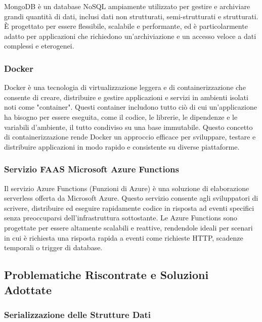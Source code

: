\documentclass{scrartcl}
\begin{document}
MongoDB è un database NoSQL ampiamente utilizzato per gestire e archiviare grandi quantità di dati, inclusi dati non strutturati, semi-strutturati e strutturati. È progettato per essere flessibile, scalabile e performante, ed è particolarmente adatto per applicazioni che richiedono un'archiviazione e un accesso veloce a dati complessi e eterogenei.

\subsubsection{Docker}

Docker è una tecnologia di virtualizzazione leggera e di containerizzazione che consente di creare, distribuire e gestire applicazioni e servizi in ambienti isolati noti come "container". Questi container includono tutto ciò di cui un'applicazione ha bisogno per essere eseguita, come il codice, le librerie, le dipendenze e le variabili d'ambiente, il tutto condiviso su una base immutabile. Questo concetto di containerizzazione rende Docker un approccio efficace per sviluppare, testare e distribuire applicazioni in modo rapido e consistente su diverse piattaforme.

\subsubsection{Servizio FAAS Microsoft Azure Functions}

Il servizio Azure Functions\cite{azurefunctions} (Funzioni di Azure) è una soluzione di elaborazione serverless offerta da Microsoft Azure\cite{microsoftazure}. Questo servizio consente agli sviluppatori di scrivere, distribuire ed eseguire rapidamente codice in risposta ad eventi specifici senza preoccuparsi dell'infrastruttura sottostante. Le Azure Functions sono progettate per essere altamente scalabili e reattive, rendendole ideali per scenari in cui è richiesta una risposta rapida a eventi come richieste HTTP, scadenze temporali o trigger di database.

\subsection{Problematiche Riscontrate e Soluzioni Adottate}

\subsubsection{Serializzazione delle Strutture Dati}
\end{document}
